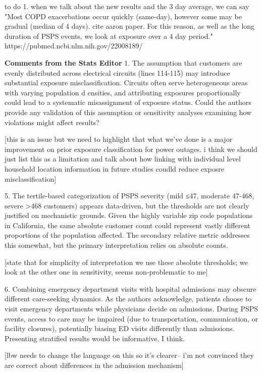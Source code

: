 to do 
1. when we talk about the new results and the 3 day average, we can say "Most COPD exacerbations occur quickly (same-day), however some may be gradual (median of 4 days). cite aaron paper. For this reason, as well as the long duration of PSPS events, we look at exposure over a 4 day period." https://pubmed.ncbi.nlm.nih.gov/22008189/


\textbf{Comments from the Stats Editor}
1.      The assumption that customers are evenly distributed across electrical circuits (lines 114-115) may introduce substantial exposure misclassification. Circuits often serve heterogeneous areas with varying population d ensities, and attributing exposures proportionally could lead to a systematic misassignment of exposure status. Could the authors provide any validation of this assumption or sensitivity analyses examining how violations might affect results?

[this is an issue but we need to highlight that what we've done is a major improvement on prior exposure classification for power outages. i think we should just list this as a limitation and talk about how linking with individual level household location information in future studies coudld reduce exposre misclassification]


5.      The tertile-based categorization of PSPS severity (mild ≤47, moderate 47-468, severe >468 customers) appears data-driven, but the thresholds are not clearly justified on mechanistic grounds. Given the highly variable zip code populations in California, the same absolute customer count could represent vastly different proportions of the population affected. The secondary relative metric addresses this somewhat, but the primary interpretation relies on absolute counts.

[state that for simplicity of interpretation we use these absolute thresholds; we look at the other one in sensitivity, seems non-problematic to me]

6.      Combining emergency department visits with hospital admissions may obscure different care-seeking dynamics. As the authors acknowledge, patients choose to visit emergency departments while physicians decide on admissions. During PSPS events, access to care may be impaired (due to transportation, communication, or facility closures), potentially biasing ED visits differently than admissions. Presenting stratified results would be informative, I think.

[lbw needs to change the language on this so it's clearer-- i'm not convinced they are correct about differences in the admission mechanism]



